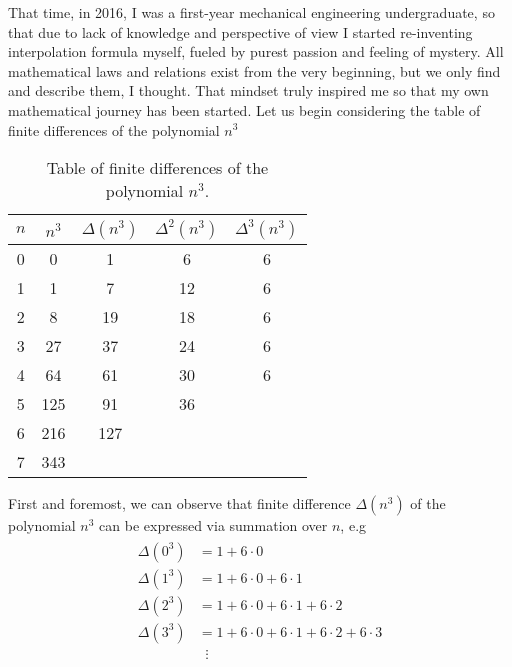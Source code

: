 That time, in 2016, I was a first-year mechanical engineering undergraduate,
so that due to lack of knowledge and perspective of view I started re-inventing interpolation
formula myself, fueled by purest passion and feeling of mystery.
All mathematical laws and relations exist from the very beginning, but we only find and describe them, I thought.
That mindset truly inspired me so that my own mathematical journey has been started.
Let us begin considering the table of finite differences of the polynomial $n^3$
\begin{table}[H]
    \begin{center}
        \setlength\extrarowheight{-6pt}
        \begin{tabular}{c|cccc}
            $n$ & $n^3$ & $\Delta(n^3)$ & $\Delta^2(n^3)$ & $\Delta^3(n^3)$ \\
            \hline
            0   & 0     & 1             & 6               & 6               \\
            1   & 1     & 7             & 12              & 6               \\
            2   & 8     & 19            & 18              & 6               \\
            3   & 27    & 37            & 24              & 6               \\
            4   & 64    & 61            & 30              & 6               \\
            5   & 125   & 91            & 36              &                 \\
            6   & 216   & 127           &                 &                 \\
            7   & 343   &               &                 &
        \end{tabular}
    \end{center}
    \caption{Table of finite differences of the polynomial $n^3$.} \label{tab:table}
\end{table}
First and foremost, we can observe that finite difference $\Delta(n^3)$ of the polynomial $n^3$
can be expressed via summation over $n$, e.g
\begin{align}
    \label{eq:cubes_interpolation}
    \begin{split}
        \Delta(0^3) &= 1+6 \cdot 0 \\
        \Delta(1^3) &= 1+6\cdot0+6\cdot1 \\
        \Delta(2^3) &= 1+6\cdot0+6\cdot1+6\cdot2 \\
        \Delta(3^3) &= 1+6\cdot0+6\cdot1+6\cdot2+6\cdot3 \\
        &\; \; \vdots
    \end{split}
\end{align}
